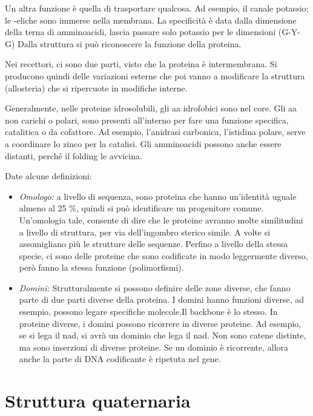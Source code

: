 Un altra funzione è quella di trasportare qualcosa. Ad esempio, il
canale potassio; le \alpha-eliche sono immerse nella membrana. La specificità
è data dalla dimensione della terna di amminoacidi, lascia passare solo
potassio per le dimensioni (G-Y-G)
Dalla struttura si può riconoscere la funzione della proteina.

Nei recettori, ci sono due parti, visto che la proteina è intermembrana.
Si producono quindi delle variazioni esterne che poi vanno a modificare
la struttura (allosteria) che si ripercuote in modifiche interne.

Generalmente, nelle proteine idrosolubili, gli aa idrofobici sono nel
core. Gli aa non carichi o polari, sono presenti all'interno per fare
una funzione specifica, catalitica o da cofattore.
Ad esempio, l'anidrasi carbonica, l'istidina polare, serve a coordinare
lo zinco per la catalisi.
Gli amminoacidi possono anche essere distanti, perché il folding le avvicina.

Date alcune definizioni:
\begin{itemize}
\item \emph{Omologo:} a livello di sequenza, sono proteina che hanno un'identità
uguale almeno al 25 \%, quindi si può identificare un progenitore
comune. Un'omologia tale, consente di dire che le proteine avranno
molte similitudini a livello di struttura, per via dell'ingombro
sterico simile. A volte si assomigliano più le strutture delle
sequenze. Perfino a livello della stessa specie, ci sono delle
proteine che sono codificate in modo leggermente diverso, però fanno
la stessa funzione (polimorfismi).
\item \emph{Domini:} Strutturalmente si possono definire delle zone diverse, che fanno parte di due parti
diverse della proteina. I domini hanno funzioni diverse, ad esempio, possono legare specifiche
molecole.Il backbone è lo stesso. In proteine diverse, i domini possono ricorrere
in diverse proteine. Ad esempio, se si lega il nad, si avrà un dominio
che lega il nad. Non sono catene distinte, ma sono inserzioni di diverse
proteine.
Se un dominio è ricorrente, allora anche la parte di DNA codificante è
ripetuta nel gene.
\end{itemize}


\section{Struttura quaternaria}

